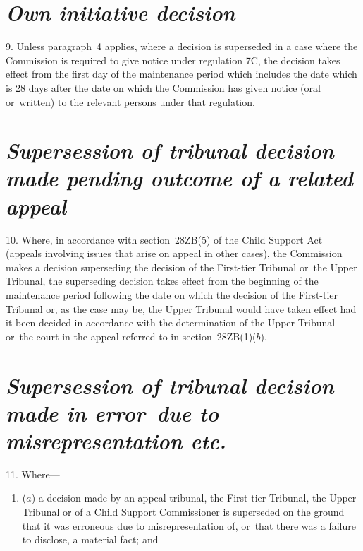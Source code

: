 \documentclass[12pt,a4paper]{article}
\begin{document}
{

\section*{\itshape Own initiative decision}

9.  Unless paragraph~4 applies, where a decision is superseded in a case where the Commission is required to give notice under regulation 7C, the decision takes effect from the first day of the maintenance period which includes the date which is 28 days after the date on which the Commission has given notice (oral or~written) to the relevant persons under that regulation.

\section*{\itshape\sloppy{} Supersession of tribunal decision made pending outcome of a related appeal}

10.  Where, in accordance with section~28ZB(5) of the Child Support Act (appeals involving issues that arise on appeal in other cases), the Commission makes a decision superseding the decision of the First-tier Tribunal or~the Upper Tribunal, the superseding decision takes effect from the beginning of the maintenance period following the date on which the decision of the First-tier Tribunal or, as the case may be, the Upper Tribunal would have taken effect had it been decided in accordance with the determination of the Upper Tribunal or~the court in the appeal referred to in section~28ZB(1)($b$).

\section*{\itshape\sloppy{}  Supersession of tribunal decision made in error~due to misrepresentation etc.}

11.  Where—
\begin{enumerate}\item[]
($a$) a decision made by 
an appeal tribunal, the First-tier Tribunal, the Upper Tribunal or of a Child Support Commissioner  %
is superseded on the ground that it was erroneous due to misrepresentation of, or~that there was a failure to disclose, a material fact; and


\end{enumerate}}
\end{document}
